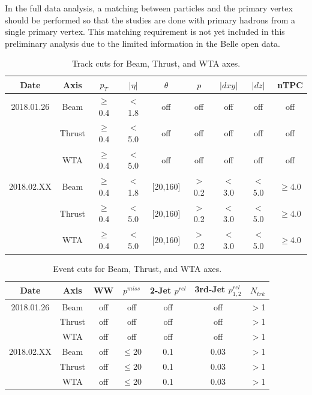 In the full data analysis, a matching between particles and the primary vertex should be performed so that the studies are done with primary hadrons from a single primary vertex. This matching requirement is not yet included in this preliminary analysis due to the limited information in the Belle open data. 

\begin{table}[h!]\centering
{}

\begin{tabular}{ccccccccc}\toprule
Date & Axis & ${p_{T}}$ & $|\eta|$ & $\theta$ & ${p}$ & $|dxy|$ & $|dz|$ & nTPC\\
\midrule
\rowcolor{black!20}2018.01.26 & Beam & $\geq$0.4 & $<$1.8 & off & off & off & off & off \\
& Thrust & $\geq$0.4 & $<$5.0 & off & off & off & off & off \\
\rowcolor{black!20} & WTA & $\geq$0.4 & $<$5.0 & off & off & off & off & off \\
2018.02.XX & Beam & $\geq$0.4 & $<$1.8 & [20,160] & $>$0.2 & $<$3.0 & $<$5.0 & $\geq$4.0 \\
\rowcolor{black!20}& Thrust & $\geq$0.4 & $<$5.0 & [20,160] & $>$0.2 & $<$3.0 & $<$5.0 & $\geq$4.0 \\
& WTA & $\geq$0.4 & $<$5.0 & [20,160] & $>$0.2 & $<$3.0 & $<$5.0 & $\geq$4.0 \\
\bottomrule
\end{tabular}
\caption{Track cuts for Beam, Thrust, and WTA axes.}
\end{table}

\begin{table}[h!]\centering
{}

\begin{tabular}{ccccccc}\toprule
Date & Axis & WW & ${p^{miss}}$ & 2-Jet ${p^{rel}}$ & 3rd-Jet ${p^{rel}_{1,2}}$ &
$N_{trk}$ \\
\midrule
\rowcolor{black!20}2018.01.26 & Beam & off & off & off & off & $>$1 \\
& Thrust & off & off & off & off & $>$1 \\
\rowcolor{black!20} & WTA & off & off & off & off & $>$1 \\
2018.02.XX & Beam & off & $\leq$20 & 0.1 & 0.03 & $>$1 \\
\rowcolor{black!20}& Thrust & off & $\leq$20 & 0.1 & 0.03 & $>$1 \\
& WTA & off & $\leq$20 & 0.1 & 0.03 & $>$1 \\
\bottomrule
\end{tabular}
\caption{Event cuts for Beam, Thrust, and WTA axes.}
\end{table}


